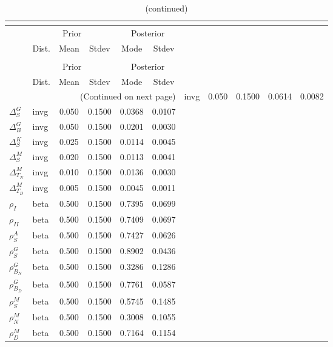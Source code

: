  
\begin{center}
\begin{longtable}{llcccc} 
\caption{Results from posterior maximization (parameters)}\\
 \label{Table:Posterior:1}\\
\toprule 
  & \multicolumn{3}{c}{Prior}  &  \multicolumn{2}{c}{Posterior} \\
  \cmidrule(r{.75em}){2-4} \cmidrule(r{.75em}){5-6}
  & Dist. & Mean  & Stdev & Mode & Stdev \\ 
\midrule \endfirsthead 
\caption{(continued)}\\
 \bottomrule 
  & \multicolumn{3}{c}{Prior}  &  \multicolumn{2}{c}{Posterior} \\
  \cmidrule(r{.75em}){2-4} \cmidrule(r{.75em}){5-6}
  & Dist. & Mean  & Stdev & Mode & Stdev \\ 
\midrule \endhead 
\bottomrule \multicolumn{6}{r}{(Continued on next page)}\endfoot 
\bottomrule\endlastfoot 
${\Delta^{A}_{S}}$ & invg &   0.050 & 0.1500 &   0.0614 &  0.0082 \\ 
${\Delta^{G}_{S}}$ & invg &   0.050 & 0.1500 &   0.0368 &  0.0107 \\ 
${\Delta^{G}_{B}}$ & invg &   0.050 & 0.1500 &   0.0201 &  0.0030 \\ 
${\Delta^{K}_{S}}$ & invg &   0.025 & 0.1500 &   0.0114 &  0.0045 \\ 
${\Delta^{M}_{S}}$ & invg &   0.020 & 0.1500 &   0.0113 &  0.0041 \\ 
${\Delta^{M}_{T_N}}$ & invg &   0.010 & 0.1500 &   0.0136 &  0.0030 \\ 
${\Delta^{M}_{T_D}}$ & invg &   0.005 & 0.1500 &   0.0045 &  0.0011 \\ 
${\rho_{I}}$ & beta &   0.500 & 0.1500 &   0.7395 &  0.0699 \\ 
${\rho_{II}}$ & beta &   0.500 & 0.1500 &   0.7409 &  0.0697 \\ 
${\rho^{A}_{S}}$ & beta &   0.500 & 0.1500 &   0.7427 &  0.0626 \\ 
${\rho^{G}_{S}}$ & beta &   0.500 & 0.1500 &   0.8902 &  0.0436 \\ 
${\rho^{G}_{B_N}}$ & beta &   0.500 & 0.1500 &   0.3286 &  0.1286 \\ 
${\rho^{G}_{B_D}}$ & beta &   0.500 & 0.1500 &   0.7761 &  0.0587 \\ 
${\rho^{M}_{S}}$ & beta &   0.500 & 0.1500 &   0.5745 &  0.1485 \\ 
${\rho^{M}_{N}}$ & beta &   0.500 & 0.1500 &   0.3008 &  0.1055 \\ 
${\rho^{M}_{D}}$ & beta &   0.500 & 0.1500 &   0.7164 &  0.1154 \\ 
\end{longtable}
 \end{center}
